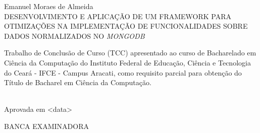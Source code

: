 \begin{folhadeaprovacao}
\vfill
\begin{center}

{Emanuel Moraes de Almeida\\}
\vspace{1.5cm}
{\textsc{\uppercase{Desenvolvimento e Aplicação de um Framework para Otimizações na Implementação de Funcionalidades Sobre Dados Normalizados no \textit{MongoDB}}}\\}
\vspace{1.5cm}
\hspace{.45\linewidth}
\begin{minipage}{.50\linewidth}
Trabalho de Conclusão de Curso (TCC) apresentado ao curso de Bacharelado em Ciência da Computação do Instituto Federal de Educação, Ciência e Tecnologia do Ceará - IFCE - Campus Aracati, como requisito parcial para obtenção do Título de Bacharel em Ciência da Computação. 
\end{minipage}
\vspace{1.0 cm}

\end{center}

\noindent\\
{Aprovada em <data>}

\vspace{1.5 cm}
\begin{center}
{BANCA EXAMINADORA}

\end{center}
\end{folhadeaprovacao}